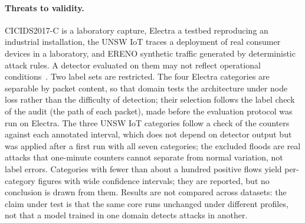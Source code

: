 \paragraph{Threats to validity.}
CICIDS2017-C is a laboratory capture, Electra a testbed reproducing an
industrial installation, the UNSW IoT traces a deployment of real consumer devices in a
laboratory, and ERENO synthetic traffic generated by deterministic attack rules. A detector
evaluated on them may not reflect operational
conditions~\cite{sommer2010outside,arp2022dos}. Two label sets are restricted. The four
Electra categories are separable by packet content, so that domain tests the architecture
under node loss rather than the difficulty of detection; their selection follows the label
check of the audit (the path of each packet), made before the evaluation protocol was run
on Electra. The three UNSW IoT categories follow a check of the counters against each
annotated interval, which does not depend on detector output but was applied after a first
run with all seven categories; the excluded floods are real attacks that one-minute
counters cannot separate from normal variation, not label errors. Categories with fewer than about a hundred positive flows yield
per-category figures with wide confidence intervals; they are reported, but no conclusion
is drawn from them. Results are not compared across datasets: the claim under test is
that the same core runs unchanged under different profiles, not that a model trained in
one domain detects attacks in another.
